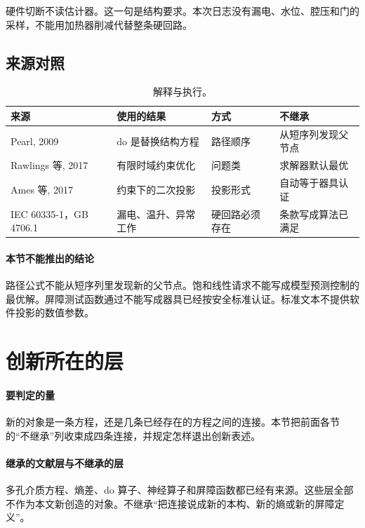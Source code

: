 硬件切断不读估计器。这一句是结构要求。本次日志没有漏电、水位、腔压和门的采样，不能用加热器削减代替整条硬回路。

\subsection{来源对照}
\begin{table}[ht]
\centering
\caption{解释与执行。}
\begin{tabularx}{\textwidth}{lXll}
\toprule
来源 & 使用的结果 & 方式 & 不继承 \\
\midrule
Pearl, 2009 & \(\mathrm{do}\) 是替换结构方程 & 路径顺序 & 从短序列发现父节点 \\
Rawlings 等, 2017 & 有限时域约束优化 & 问题类 & 求解器默认最优 \\
Ames 等, 2017 & 约束下的二次投影 & 投影形式 & 自动等于器具认证 \\
IEC 60335-1，GB 4706.1 & 漏电、温升、异常工作 & 硬回路必须存在 & 条款写成算法已满足 \\
\bottomrule
\end{tabularx}
\end{table}

\paragraph{本节不能推出的结论}
路径公式不能从短序列里发现新的父节点。饱和线性请求不能写成模型预测控制的最优解。屏障测试函数通过不能写成器具已经按安全标准认证。标准文本不提供软件投影的数值参数。

\section{创新所在的层}

\paragraph{要判定的量}
新的对象是一条方程，还是几条已经存在的方程之间的连接。本节把前面各节的“不继承”列收束成四条连接，并规定怎样退出创新表述。

\paragraph{继承的文献层与不继承的层}
多孔介质方程、熵差、$\mathrm{do}$ 算子、神经算子和屏障函数都已经有来源\cite{whitaker1977,lindley1956,pearl2009,li2021fno,lu2021deeponet,ames2017cbf}。这些层全部不作为本文新创造的对象。不继承“把连接说成新的本构、新的熵或新的屏障定义”。

